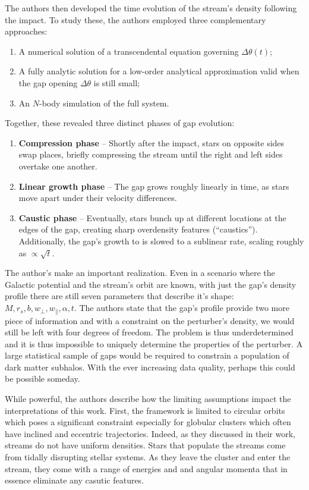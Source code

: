             The authors then developed the time evolution of the stream's density following the impact. To study these, the authors employed three complementary approaches:
            \begin{enumerate}
                \item A numerical solution of a transcendental equation governing $\Delta \theta(t)$;
                \item A fully analytic solution for a low-order analytical approximation valid when the gap opening $\Delta \theta$ is still small;
                \item An $N$-body simulation of the full system.
            \end{enumerate}

            Together, these revealed three distinct phases of gap evolution:
            \begin{enumerate}
                \item \textbf{Compression phase} --  Shortly after the impact, stars on opposite sides swap places, briefly compressing the stream until the right and left sides overtake one another. 
                \item \textbf{Linear growth phase} -- The gap grows roughly linearly in time, as stars move apart under their velocity differences.
                \item \textbf{Caustic phase} -- Eventually, stars bunch up at different locations at the edges of the gap, creating sharp overdensity features (``caustics''). Additionally, the gap's growth to is slowed to a sublinear rate, scaling roughly as $\propto \sqrt{t}$.
            \end{enumerate}


            The author's make an important realization. Even in a scenario where the Galactic potential and the stream's orbit are known, with just the gap's density profile there are still seven parameters that describe it's shape: $M,r_s,b,w_\perp,w_\parallel,\alpha,t$. The authors state that the gap's profile provide two more piece of information and with a constraint on the perturber's density, we would still be left with four degrees of freedom. The problem is thus underdetermined and it is thus impossible to uniquely determine the properties of the perturber. A large statistical sample of gaps would be required to constrain a population of dark matter subhalos. With the ever increasing data quality, perhaps this could be possible someday.  

            While powerful, the authors describe how the limiting assumptions impact the interpretations of this work. First, the framework is limited to circular orbits which poses a significant constraint especially for globular clusters which often have inclined and eccentric trajectories. Indeed, as they discussed in their work, streams do not have uniform densities. Stars that populate the streams come from tidally disrupting stellar systems. As they leave the cluster and enter the stream, they come with a range of energies and and angular momenta that in essence eliminate any casutic features. 

